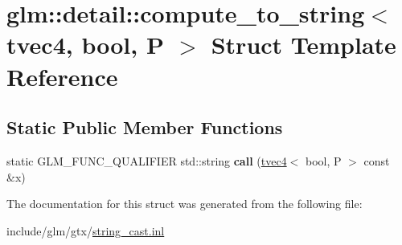 \hypertarget{structglm_1_1detail_1_1compute__to__string_3_01tvec4_00_01bool_00_01P_01_4}{}\section{glm\+:\+:detail\+:\+:compute\+\_\+to\+\_\+string$<$ tvec4, bool, P $>$ Struct Template Reference}
\label{structglm_1_1detail_1_1compute__to__string_3_01tvec4_00_01bool_00_01P_01_4}
\subsection*{Static Public Member Functions}
\begin{DoxyCompactItemize}
\item 
\mbox{\label{structglm_1_1detail_1_1compute__to__string_3_01tvec4_00_01bool_00_01P_01_4_a22a41058af4ceb92f6c12ad968a4205d}} 
static G\+L\+M\+\_\+\+F\+U\+N\+C\+\_\+\+Q\+U\+A\+L\+I\+F\+I\+ER std\+::string {\bfseries call} (\hyperlink{structglm_1_1tvec4}{tvec4}$<$ bool, P $>$ const \&x)
\end{DoxyCompactItemize}


The documentation for this struct was generated from the following file\+:\begin{DoxyCompactItemize}
\item 
include/glm/gtx/\hyperlink{string__cast_8inl}{string\+\_\+cast.\+inl}\end{DoxyCompactItemize}
